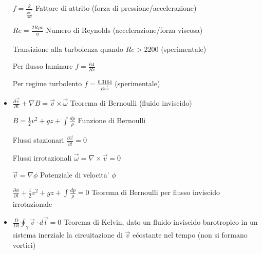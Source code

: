 \documentclass[a4paper]{article}
\begin{document}
\begin{itemize}
	$f=\frac{k}{\frac{\rho \overline{v}^2}{4R}}$ Fattore di attrito (forza di pressione/accelerazione)
	
	$Re = \frac{2R\rho \overline{v}}{\eta} $ Numero di Reynolds (accelerazione/forza viscosa)
	
	Transizione alla turbolenza quando $Re > 2200$ (sperimentale)
	
	Per flusso laminare $f = \frac{64}{Re}$
	
	Per regime turbolento $f= \frac{0.3164}{Re^\frac{1}{4}}$ (sperimentale)
	
	\item $\frac{\partial \overrightarrow{v}}{\partial t} + \nabla B = \overrightarrow{v} \times \overrightarrow{\omega}$ Teorema di Bernoulli (fluido inviscido)
	
	$B=\frac{1}{2}v^2 + gz + \int \frac{dp}{\rho}$ Funzione di Bernoulli
	
	Flussi stazionari $\frac{\partial \overrightarrow{v}}{\partial t}=0$
	
	Flussi irrotazionali $\overrightarrow{\omega}=\nabla \times \overrightarrow{v}=0$
	
	$\overrightarrow{v}=\nabla \phi$ Potenziale di velocita\' $\phi$
	
	$\frac{\partial \phi}{\partial t}+\frac{1}{2}v^2 + gz + \int \frac{dp}{\rho}=0$ Teorema di Bernoulli per flusso inviscido irrotazionale
	
	\item $ \frac{D}{Dt} \oint_\gamma \overrightarrow{v} \cdot d\overrightarrow{l} = 0 $ Teorema di Kelvin, dato un fluido inviscido barotropico in un sistema inerziale la circuitazione di $\overrightarrow{v}$ e\' costante nel tempo (non si formano vortici)
	
\end{itemize}	
	
\end{document}
